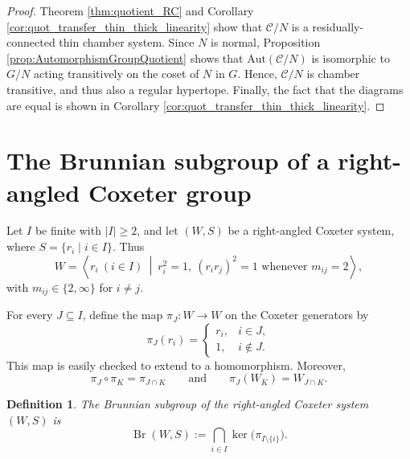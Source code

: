 \documentclass[10pt,a4paper]{amsart}
\newtheorem{definition}[prop]{Definition}
\newcommand{\Aut}{\mathrm{Aut}}
\newcommand{\C}{\mathcal{C}}
\newcommand{\Br}{\operatorname{Br}}
\begin{document}
\begin{proof}
    Theorem \ref{thm:quotient_RC} and Corollary \ref{cor:quot_transfer_thin_thick_linearity} show that $\C/N$ is a residually-connected thin chamber system. Since $N$ is normal, Proposition \ref{prop:AutomorphismGroupQuotient} shows that $\Aut(\C/N)$ is isomorphic to $G/N$ acting transitively on the coset of $N$ in $G$. Hence, $\C/N$ is chamber transitive, and thus also a regular hypertope. Finally, the fact that the diagrams are equal is shown in Corollary \ref{cor:quot_transfer_thin_thick_linearity}.
\end{proof}

\section{The Brunnian subgroup of a right-angled Coxeter group}\label{sec:brunnian}

Let $I$ be finite with $|I|\geq2$, and let $(W,S)$ be a right-angled Coxeter
system, where $S=\{r_i\mid i\in I\}$.  Thus
\[
    W=\left\langle r_i\ (i\in I)\ \middle|\
        r_i^2=1,\ (r_ir_j)^2=1\text{ whenever }m_{ij}=2
      \right\rangle,
\]
with $m_{ij}\in\{2,\infty\}$ for $i\neq j$.

For every $J\subseteq I$, define the map $\pi_J\colon W\to W$ on the Coxeter
generators by
\begin{equation}
\label{eq:deletion-retraction}
    \pi_J(r_i)=
    \begin{cases}
        r_i,&i\in J,\\
        1,&i\notin J.
    \end{cases}
\end{equation}
This map is easily checked to extend to a homomorphism.
Moreover,
\begin{equation}
\label{eq:retraction-identities}
    \pi_J\circ\pi_K=\pi_{J\cap K}
    \qquad\text{and}\qquad
    \pi_J(W_K)=W_{J\cap K}.
\end{equation}

\begin{definition}
The \emph{Brunnian subgroup} of the right-angled Coxeter system $(W,S)$ is
\begin{equation*}
    \Br(W,S)
      :=\bigcap_{i\in I}\ker\bigl(\pi_{I\setminus\{i\}}\bigr).
\end{equation*}
\end{definition}
\end{document}

